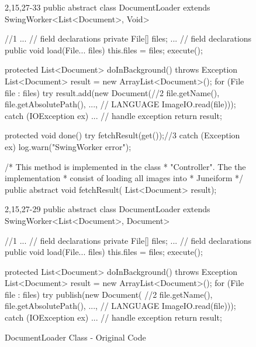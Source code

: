 \begin{figure}[H]
\begin{minipage}{0.48\textwidth}
\begin{sourcecode}
\begin{javacode}{2,15,27-33}
public abstract class DocumentLoader 
	extends SwingWorker<List<Document>, Void> { //1$\label{codeline:DocumentLoader-1a}$
    ... // field declarations
    private File[] files;
    ... // field declarations
    public void load(File... files) {
        this.files = files;
        execute();
    }
    
    protected List<Document> doInBackground() throws Exception {
        List<Document> result = new ArrayList<Document>();
        for (File file : files) {
            try {
                result.add(new Document(//2$\label{codeline:DocumentLoader-2a}$
                        file.getName(),
                        file.getAbsolutePath(),
                        ..., // LANGUAGE
                        ImageIO.read(file)));
            } catch (IOException ex) {
                ... // handle exception
            }
        }
        return result;
    }

    protected void done() {
        try {
            fetchResult(get());//3$\label{codeline:DocumentLoader-3a}$
        } catch (Exception ex) {
            log.warn("SwingWorker error");
        }
    }

	/* This method is implemented in the class 
	 * "Controller". The the implementation 
	 * consist of loading all images into 
	 * Juneiform
	*/
    public abstract void fetchResult(
    	List<Document> result);
}
\end{javacode}
\caption{DocumentLoader Class - Original Code}
\label{code:example-original-v1}
\end{sourcecode}
\end{minipage}\hspace{0.7cm}
\begin{minipage}{0.48\textwidth}
\begin{sourcecode}
\begin{javacode}{2,15,27-29}
public abstract class DocumentLoader 
	extends SwingWorker<List<Document>, Document> { //1$\label{codeline:DocumentLoader-1b}$
    ... // field declarations
    private File[] files;
    ... // field declarations
    public void load(File... files) {
        this.files = files;
        execute();
    }
    
    protected List<Document> doInBackground() throws Exception {
        List<Document> result = new ArrayList<Document>();
        for (File file : files) {
            try {
                publish(new Document( //2$\label{codeline:DocumentLoader-2b}$
                        file.getName(),
                        file.getAbsolutePath(),
                        ..., // LANGUAGE
                        ImageIO.read(file)));
            } catch (IOException ex) {
                ... // handle exception
            }
        }
        return result;
    }

}
\end{javacode}
\end{sourcecode}
\end{minipage}
\end{figure}
